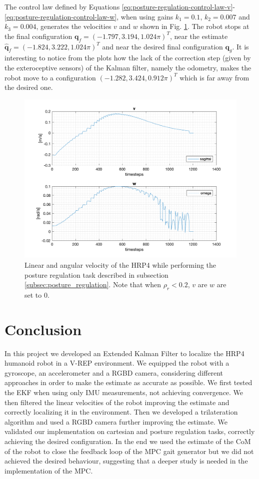 \documentclass[a4paper]{article}
\begin{document}
The control law defined by Equations
\ref{eq:posture-regulation-control-law-v}-\ref{eq:posture-regulation-control-law-w},
when using gains $k_1=0.1$, $k_2=0.007$ and $k_3=0.004$,
generates the velocities $v$ and $w$ shown in Fig. \ref{fig:unicycle_velocities_posture_regulation}. The robot stops at the final
configuration $\bm{q}_f = (-1.797, 3.194, 1.024\pi)^T$, near the estimate
$\bm{\hat{q}}_f = (-1.824, 3.222, 1.024\pi)^T$ and
near the desired final configuration $\bm{q}_g$. It is interesting to notice
from the plots how the lack of the correction step (given by the exteroceptive
sensors) of the Kalman filter, namely the odometry, makes the robot move to a configuration
$(-1.282, 3.424, 0.912\pi)^T$ which is far away from the desired one.
\begin{figure}
    \centering
    \includegraphics[width=\textwidth]{images/unicycle_velocities.png}
    \caption{Linear and angular velocity of the HRP4 while performing the
        posture regulation task described in subsection \ref{subsec:posture_regulation}.
        Note that when $\rho_r < 0.2$, $v$ are $w$ are set to 0.}
    \label{fig:unicycle_velocities_posture_regulation}
\end{figure}

\section{Conclusion}
In this project we developed an Extended Kalman Filter to localize the HRP4
humanoid robot in a V-REP environment. We equipped the robot with a gyroscope,
an accelerometer and a RGBD camera, considering different approaches in order
to make the estimate as accurate as possible. We first tested the EKF when
using only IMU measurements, not achieving convergence. We then filtered the
linear velocities of the robot improving the estimate and correctly localizing
it in the environment. Then we developed a trilateration algorithm
and used a RGBD camera further improving the estimate. We validated our
implementation on cartesian and posture regulation tasks, correctly
achieving the desired configuration. In the end we used the estimate of the
CoM of the robot to close the feedback loop of the MPC gait generator but we did not
achieved the desired behaviour, suggesting that a deeper study is needed in the
implementation of the MPC.
\end{document}
